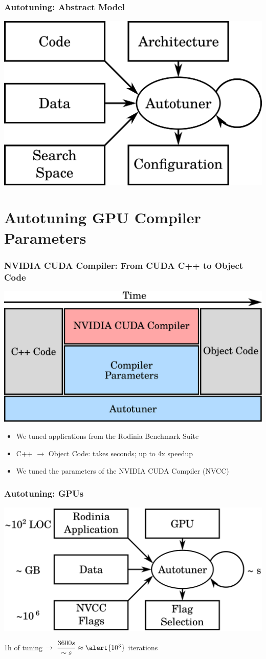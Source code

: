 \documentclass[10pt, compress, aspectratio=169]{beamer}
\begin{document}
\begin{frame}
    \frametitle{Autotuning: Abstract Model}
    \begin{center}
        \includegraphics[width=.5\textwidth]{overview}
    \end{center}
\end{frame}

\section{Autotuning GPU Compiler Parameters}

\begin{frame}
    \frametitle{NVIDIA CUDA Compiler: From CUDA C++ to Object Code}
    \begin{center}
        \includegraphics[width=.6\textwidth]{gpu-stack}
    \end{center}

    \begin{itemize}
        \item We tuned applications from the \alert{Rodinia Benchmark Suite}
        \item C++ $\rightarrow$ Object Code: takes \alert{seconds}; \alert{up to 4x speedup}
        \item We \alert{tuned the parameters} of the NVIDIA CUDA Compiler (NVCC)
    \end{itemize}
\end{frame}

\begin{frame}
    \frametitle{Autotuning: GPUs}
    \begin{center}
        \includegraphics[width=.73\textwidth]{overview_gpus}

        \alert{1h} of tuning $\rightarrow \; \dfrac{3600s}{\sim{}s} \approx \alert{10^3}$ \alert{iterations}
    \end{center}
\end{frame}
\end{document}
